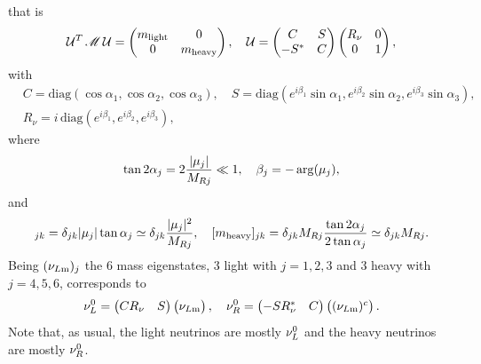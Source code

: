 \documentclass[12pt,a4paper]{article}
\begin{document}
that is
\begin{equation}\label{eq:MajoranaDiagon:00}
 \mathcal U^T\,\mathscr M\,\mathcal U=\begin{pmatrix}m_{\rm light}& 0\\ 0& m_{\rm heavy}\end{pmatrix},\quad \mathcal U=\begin{pmatrix}C & S\\ -S^\ast & C\end{pmatrix}\begin{pmatrix}R_\nu&0\\ 0&1\end{pmatrix},
\end{equation}
with
\begin{equation}
\begin{aligned}
 &C=\text{diag}(\cos\alpha_1,\cos\alpha_2,\cos\alpha_3),\quad S=\text{diag}(e^{i\beta_1}\sin\alpha_1,e^{i\beta_2}\sin\alpha_2,e^{i\beta_3}\sin\alpha_3),\\
 &R_\nu=i\,\text{diag}(e^{i\beta_1},e^{i\beta_2},e^{i\beta_3}),
\end{aligned}
\end{equation}
where
\begin{equation}\label{eq:Majorana:LHmix}
 \tan 2\alpha_j=2\frac{|\mu_j|}{M_{Rj}}\ll 1,\quad \beta_j=-\arg(\mu_j),
\end{equation}
and
\begin{equation}
 [m_{\rm light}]_{jk}=\delta_{jk}\abs{\mu_j}\tan\alpha_j\simeq \delta_{jk}\frac{\abs{\mu_j}^2}{M_{Rj}},\quad [m_{\rm heavy}]_{jk}=\delta_{jk}M_{Rj}\frac{\tan2\alpha_j}{2\tan\alpha_j}\simeq \delta_{jk}M_{Rj}.
\end{equation}
Being $(\nu_{L{\rm m}})_j$ the 6 mass eigenstates, 3 light with $j=1,2,3$ and 3 heavy with $j=4,5,6$,  corresponds to
\begin{equation}\label{eq:Neutrinos:LRMass}
 \nu_L^0=\begin{pmatrix}CR_\nu & S\end{pmatrix}\begin{pmatrix}\nu_{L{\rm m}}\end{pmatrix},\quad \nu_R^0=\begin{pmatrix}-SR_\nu^\ast & C\end{pmatrix}\begin{pmatrix}(\nu_{L{\rm m}})^c\end{pmatrix}.
\end{equation}
Note that, as usual, the light neutrinos are mostly $\nu_L^0$ and the heavy neutrinos are mostly $\nu_R^0$.
\end{document}
